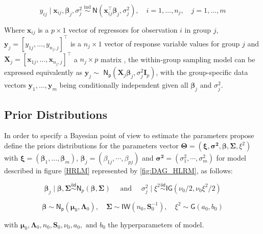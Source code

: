 \begin{equation}
\label{HRLM}
y_{ij} \mid \bm{x}_{ij}, \bm{\beta}_j, \sigma_j^2 \stackrel{\text { ind }}{\sim} \mathsf{N}\left(\bm{x}_{ij}^{\bm{\top}} \bm{\beta}_j, \sigma_j^2\right), \quad i=1, \ldots, n_j, \quad j=1, \ldots, m
\end{equation}

Where $\bm{x}_{ij}$ is a $p \times 1$ vector of regressors for observation $i$ in group $j$,  $\bm{y}_j = \left[y_{1j}, \ldots, y_{n_j, j}\right]^\top$  is a $n_j \times 1$ vector of response variable values for group $j$  and $\mathbf{X}_j = \left[\bm{x}_{1j}, \ldots, \bm{x}_{n_j, j}\right]^\top$ a $n_j \times p$ matrix , the within-group sampling model can be expressed equivalently as $\bm{y}_j \sim$  $\mathsf{N_p}\left(\mathbf{X}_j \bm{\beta}_j, \sigma^2_j \mathbf{I}_p\right)$, with the group-specific data vectors $\bm{y}_1, \ldots, \bm{y}_m$ being conditionally independent given all $\bm{\beta}_j$ and $\sigma^2_j$.

\subsection{Prior Distributions}

In order to specify a Bayesian point of view to estimate the parameters   \cite{SOSA} propose define the priors distributions for the parameters vector $\bm{\Theta}=(\bm{\xi},\bm{\sigma^2},\bm{\beta},\bm{\Sigma},\xi^2)$ with $\bm{\xi}=(\bm{\beta}_1, \ldots, \bm{\beta}_m)$,    $\bm{\beta}_j=(\beta_{1j},\cdots,\beta_{pj})$ and $\bm{\sigma^2}=(\sigma_1^2,\cdots,\sigma_m^2)$  for model described in figure \ref{HRLM} represented by \ref{fig:DAG_HLRM}, as follows:

\begin{equation}
    \label{hyper_HRLM_1}
    \bm{\beta}_j \mid \bm{\beta}, \bm{\Sigma} \stackrel{\mathsf{iid}}{\sim} \mathsf{N}_p(\bm{\beta}, \bm{\Sigma}) \quad \text { and } \quad \sigma_j^2 \mid \xi^2 \stackrel{\mathsf{iid}}{\sim} \mathsf{IG}\left(\nu_0 / 2, \nu_0 \xi^2 / 2\right)
\end{equation}

\begin{equation}
    \label{hyper_HRLM_2}
    \bm{\beta} \sim \mathsf{N_p}\left(\bm{\mu}_0, \bm{\Lambda}_0\right), \quad \bm{\Sigma} \sim \mathsf{IW}\left(n_0, \mathbf{S}_0^{-1}\right), \quad \xi^2 \sim \mathsf{G}\left(a_0, b_0\right)
\end{equation}

with $\bm{\mu}_0, \bm{\Lambda}_0, n_0, \mathbf{S}_0, \nu_0, a_0, \text { and } b_0$ the hyperparameters of model.

